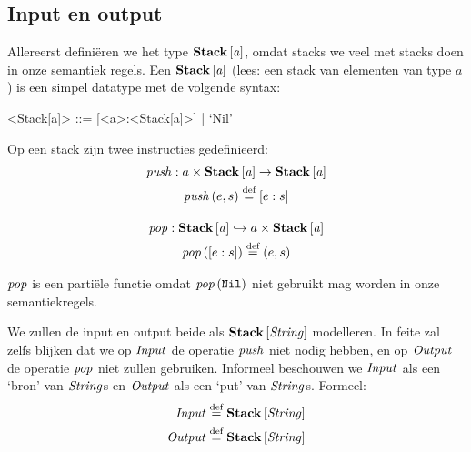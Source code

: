\subsection{Input en output}
\label{sec:def:io}

Allereerst definiëren we het type $\mathbf{Stack}\left[\mathit{a}\right]$, omdat stacks we veel met stacks
doen in onze semantiek regels. Een $\mathbf{Stack}\left[\mathit{a}\right]$ (lees: een stack van elementen
van type $a$) is een simpel datatype met de volgende syntax:

\begin{grammar}
	<Stack[a]> ::= [<a>:<Stack[a]>] | `Nil'
\end{grammar}

Op een stack zijn twee instructies gedefinieerd:
\begin{gather*}
	\mathit{push} : a \times \mathbf{Stack}\left[\mathit{a}\right] \to \mathbf{Stack}\left[\mathit{a}\right] \\
	\mathit{push}\left(e, s\right) \stackrel{\text{def}}{=} [e:s] \\[1em]
	\mathit{pop} : \mathbf{Stack}\left[\mathit{a}\right] \hookrightarrow a \times \mathbf{Stack}\left[\mathit{a}\right] \\
	\mathit{pop}\left([e:s]\right) \stackrel{\text{def}}{=} (e,s) \\
\end{gather*}

$\mathit{pop}$ is een partiële functie omdat $\mathit{pop}\left(\texttt{Nil}\right)$ niet gebruikt mag worden in
onze semantiekregels. %

\medskip
We zullen de input en output beide als $\mathbf{Stack}\left[\mathit{\mathit{String}}\right]$ modelleren. In feite
zal zelfs blijken dat we op $\mathit{Input}$ de operatie $\mathit{push}$ niet nodig hebben,
en op $\mathit{Output}$ de operatie $\mathit{pop}$ niet zullen gebruiken. Informeel
beschouwen we $\mathit{Input}$ als een `bron' van $\mathit{String}$s en $\mathit{Output}$ als een `put'
van $\mathit{String}$s. Formeel:
\begin{align*}
	\mathit{Input} &\stackrel{\text{def}}{=} \mathbf{Stack}\left[\mathit{\mathit{String}}\right] \\ \mathit{Output} &\stackrel{\text{def}}{=} \mathbf{Stack}\left[\mathit{\mathit{String}}\right]
\end{align*}

